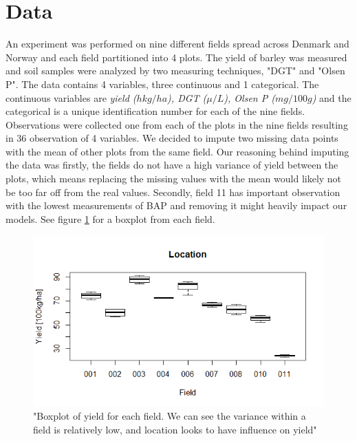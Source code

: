 \documentclass{article}
\begin{document}
\section{Data}
An experiment was performed on nine different fields spread across Denmark and Norway and each field partitioned into 4 plots. The yield of barley was measured and soil samples were analyzed by two measuring techniques, "DGT" and "Olsen P".
The data contains 4 variables, three continuous and 1 categorical. The continuous variables are \textit{yield ($hkg/ha$), DGT ($\mu/L$), Olsen P ($mg/100g$)} and the categorical is a unique identification number for each of the nine fields.
Observations were collected one from each of the plots in the nine fields resulting in 36 observation of 4 variables.
We decided to impute two missing data points with the mean of other plots from the same field.
Our reasoning behind imputing the data was firstly, the fields do not have a high variance of yield between the plots, which means replacing the missing values with the mean would likely not be too far off from the real values.
Secondly, field 11 has important observation with the lowest measurements of BAP and removing it might heavily impact our models. See figure \ref{fig:loc} for a boxplot from each field.
 
\begin{figure}[H]
\includegraphics[width=\linewidth]{locationYield.png}
\caption{"Boxplot of yield for each field. We can see the variance within a field is relatively low, and location looks to have influence on yield"}
\label{fig:loc}
\end{figure}
\end{document}
